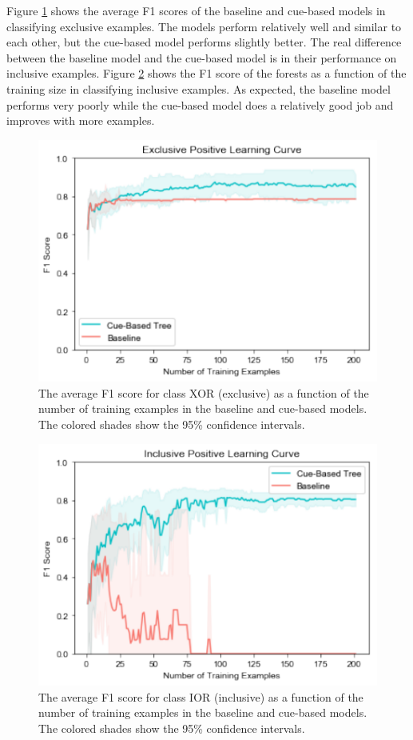 \documentclass[floatsintext,man]{apa6}
\theoremstyle{definition}
\theoremstyle{definition}
\theoremstyle{definition}
\theoremstyle{remark}
\begin{document}
Figure \ref{fig:XorBinary} shows the average F1 scores of the baseline
and cue-based models in classifying exclusive examples. The models
perform relatively well and similar to each other, but the cue-based
model performs slightly better. The real difference between the baseline
model and the cue-based model is in their performance on inclusive
examples. Figure \ref{fig:IorBinary} shows the F1 score of the forests
as a function of the training size in classifying inclusive examples. As
expected, the baseline model performs very poorly while the cue-based
model does a relatively good job and improves with more examples.

\begin{figure}
\centering
\includegraphics{figs/XorBinary-1.pdf}
\caption{\label{fig:XorBinary}The average F1 score for class XOR (exclusive)
as a function of the number of training examples in the baseline and
cue-based models. The colored shades show the 95\% confidence
intervals.}
\end{figure}

\begin{figure}
\centering
\includegraphics{figs/IorBinary-1.pdf}
\caption{\label{fig:IorBinary}The average F1 score for class IOR (inclusive)
as a function of the number of training examples in the baseline and
cue-based models. The colored shades show the 95\% confidence
intervals.}
\end{figure}
\end{document}
